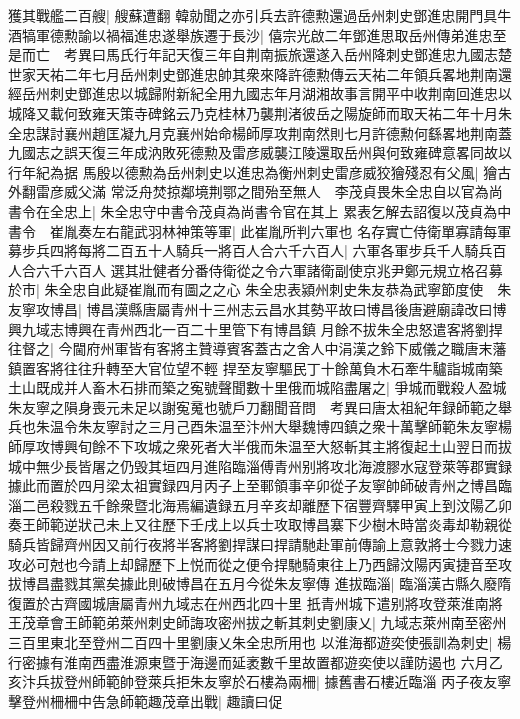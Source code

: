 獲其戰艦二百艘|{
	艘蘇遭翻}
韓勍聞之亦引兵去許德勲還過岳州刺史鄧進忠開門具牛酒犒軍德勲諭以禍福進忠遂舉族遷于長沙|{
	僖宗光啟二年鄧進思取岳州傳弟進忠至是而亡　考異曰馬氏行年記天復三年自荆南振旅還遂入岳州降刺史鄧進忠九國志楚世家天祐二年七月岳州刺史鄧進忠帥其衆來降許德勲傳云天祐二年領兵畧地荆南還經岳州刺史鄧進忠以城歸附新紀全用九國志年月湖湘故事言開平中收荆南回進忠以城降又載何致雍天策寺碑銘云乃克桂林乃襲荆渚彼岳之陽旋師而取天祐二年十月朱全忠謀討襄州趙匡凝九月克襄州始命楊師厚攻荆南然則七月許德勲何繇畧地荆南蓋九國志之誤天復三年成汭敗死德勲及雷彦威襲江陵還取岳州與何致雍碑意畧同故以行年紀為据}
馬殷以德勲為岳州刺史以進忠為衡州刺史雷彦威狡獪殘忍有父風|{
	獪古外翻雷彦威父滿}
常泛舟焚掠鄰境荆鄂之間殆至無人　李茂貞畏朱全忠自以官為尚書令在全忠上|{
	朱全忠守中書令茂貞為尚書令官在其上}
累表乞解去詔復以茂貞為中書令　崔胤奏左右龍武羽林神策等軍|{
	此崔胤所判六軍也}
名存實亡侍衛單寡請每軍募步兵四將每將二百五十人騎兵一將百人合六千六百人|{
	六軍各軍步兵千人騎兵百人合六千六百人}
選其壯健者分番侍衛從之令六軍諸衛副使京兆尹鄭元規立格召募於市|{
	朱全忠自此疑崔胤而有圖之之心}
朱全忠表潁州刺史朱友恭為武寧節度使　朱友寧攻博昌|{
	博昌漢縣唐屬青州十三州志云昌水其勢平故曰博昌後唐避廟諱改曰博興九域志博興在青州西北一百二十里管下有博昌鎮}
月餘不拔朱全忠怒遣客將劉捍往督之|{
	今閫府州軍皆有客將主贊導賓客蓋古之舍人中涓漢之鈴下威儀之職唐末藩鎮置客將往往升轉至大官位望不輕}
捍至友寧驅民丁十餘萬負木石牽牛驢詣城南築土山既成并人畜木石排而築之寃號聲聞數十里俄而城陷盡屠之|{
	爭城而戰殺人盈城朱友寧之隕身喪元未足以謝寃䰟也號戶刀翻聞音問　考異曰唐太祖紀年録師範之舉兵也朱温令朱友寧討之三月己酉朱温至汴州大舉魏博四鎮之衆十萬擊師範朱友寧楊師厚攻博興旬餘不下攻城之衆死者大半俄而朱温至大怒斬其主將復起土山翌日而拔城中無少長皆屠之仍毁其垣四月進陷臨淄傅青州别將攻北海渡膠水寇登萊等郡實録據此而置於四月梁太祖實録四月丙子上至鄆領事辛卯從子友寧帥師破青州之博昌臨淄二邑殺戮五千餘衆暨北海焉編遺録五月辛亥却離歷下宿豐齊驛甲寅上到汶陽乙卯奏王師範逆狀己未上又往歷下壬戌上以兵士攻取博昌寨下少樹木時當炎毒却勒親從騎兵皆歸齊州因又前行夜將半客將劉捍謀曰捍請馳赴軍前傳諭上意敦將士今戮力速攻必可尅也今請上却歸歷下上悦而從之便令捍馳騎東往上乃西歸汶陽丙寅捷音至攻拔博昌盡戮其黨矣據此則破博昌在五月今從朱友寧傳}
進拔臨淄|{
	臨淄漢古縣久廢隋復置於古齊國城唐屬青州九域志在州西北四十里}
扺青州城下遣别將攻登萊淮南將王茂章會王師範弟萊州刺史師誨攻密州拔之斬其刺史劉康乂|{
	九域志萊州南至密州三百里東北至登州二百四十里劉康乂朱全忠所用也}
以淮海都遊奕使張訓為刺史|{
	楊行密據有淮南西盡淮源東暨于海邊而延袤數千里故置都遊奕使以謹防遏也}
六月乙亥汴兵拔登州師範帥登萊兵拒朱友寧於石樓為兩柵|{
	據舊書石樓近臨淄}
丙子夜友寧擊登州柵柵中告急師範趣茂章出戰|{
	趣讀曰促}
